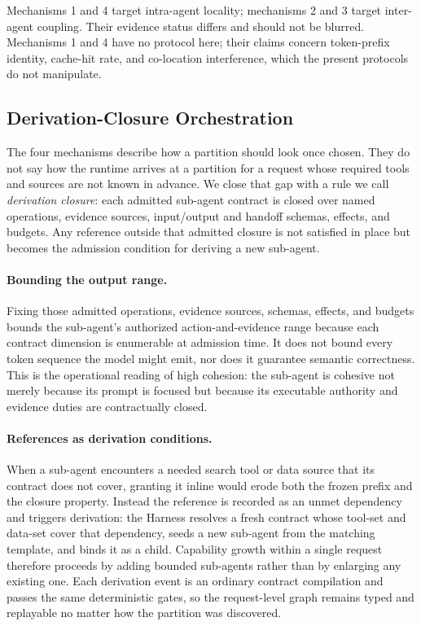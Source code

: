 Mechanisms 1 and 4 target intra-agent locality; mechanisms 2 and 3 target inter-agent coupling. Their evidence status differs and should not be blurred. Mechanisms 1 and 4 have no protocol here; their claims concern token-prefix identity, cache-hit rate, and co-location interference, which the present protocols do not manipulate.

\subsection{Derivation-Closure Orchestration}
\label{sec:derivation-closure}

The four mechanisms describe how a partition should look once chosen. They do not say how the runtime arrives at a partition for a request whose required tools and sources are not known in advance. We close that gap with a rule we call \textit{derivation closure}: each admitted sub-agent contract is closed over named operations, evidence sources, input/output and handoff schemas, effects, and budgets. Any reference outside that admitted closure is not satisfied in place but becomes the admission condition for deriving a new sub-agent.

\paragraph{Bounding the output range.}
Fixing those admitted operations, evidence sources, schemas, effects, and budgets bounds the sub-agent's authorized action-and-evidence range because each contract dimension is enumerable at admission time. It does not bound every token sequence the model might emit, nor does it guarantee semantic correctness. This is the operational reading of high cohesion: the sub-agent is cohesive not merely because its prompt is focused but because its executable authority and evidence duties are contractually closed.

\paragraph{References as derivation conditions.}
When a sub-agent encounters a needed search tool or data source that its contract does not cover, granting it inline would erode both the frozen prefix and the closure property. Instead the reference is recorded as an unmet dependency and triggers derivation: the Harness resolves a fresh contract whose tool-set and data-set cover that dependency, seeds a new sub-agent from the matching template, and binds it as a child. Capability growth within a single request therefore proceeds by adding bounded sub-agents rather than by enlarging any existing one. Each derivation event is an ordinary contract compilation and passes the same deterministic gates, so the request-level graph remains typed and replayable no matter how the partition was discovered.

